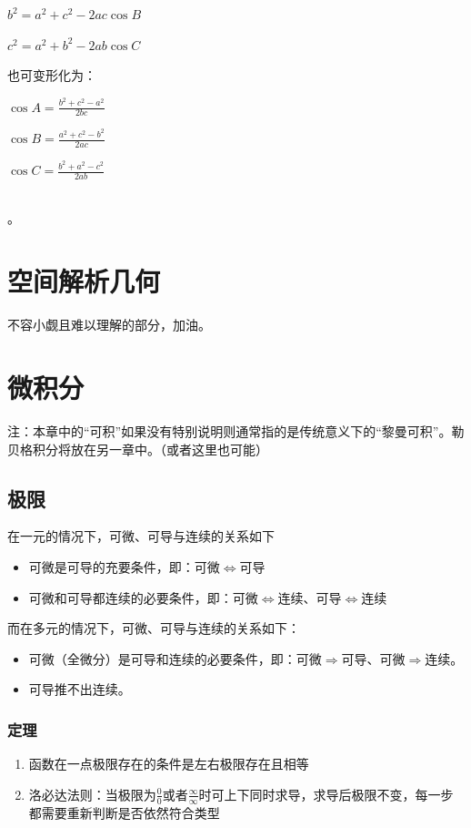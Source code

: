\documentclass[UTF8]{ctexbook}
\begin{document}
{{{  $b^2 = a^2 + c^2 - 2ac\cos B$

  $c^2 = a^2 + b^2 - 2ab\cos C$

  也可变形化为：

  $\cos A = \frac{b^2 + c^2 - a^2}{2bc}$

  $\cos B = \frac{a^2 + c^2 - b^2}{2ac}$

  $\cos C = \frac{b^2 + a^2 - c^2}{2ab}$
}%
\\

。

}%

\section{空间解析几何}{
  不容小觑且难以理解的部分，加油。


 }%

\section{微积分}{
注：本章中的“可积”如果没有特别说明则通常指的是传统意义下的“黎曼可积”。勒贝格积分将放在另一章中。（或者这里也可能）

\subsection{极限}{

  在一元的情况下，可微、可导与连续的关系如下

  \begin{itemize}
    \item 可微是可导的充要条件，即：可微$\Leftrightarrow$可导
    \item 可微和可导都连续的必要条件，即：可微$\Leftrightarrow$连续、可导$\Leftrightarrow$连续
  \end{itemize}

  而在多元的情况下，可微、可导与连续的关系如下：

  \begin{itemize}
    \item 可微（全微分）是可导和连续的必要条件，即：可微$\Rightarrow$可导、可微$\Rightarrow$连续。
    \item 可导推不出连续。
  \end{itemize}

  \subsubsection{定理}{
    \begin{enumerate}
      \item 函数在一点极限存在的条件是左右极限存在且相等
      \item 洛必达法则：当极限为$\frac{0}{0}$或者$\frac{\infty}{\infty}$时可上下同时求导，求导后极限不变，每一步都需要重新判断是否依然符合类型
    \end{enumerate}
  }%

}}}
\end{document}
